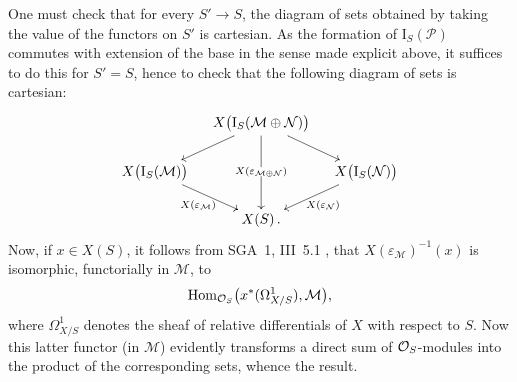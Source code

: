 One must check that for every \(S'\to S\), the diagram of sets obtained by
taking the value of the functors on \(S'\) is cartesian. As the formation of
\(\mathrm{I}_S(\mathcal{P})\) commutes with extension of the base in the sense
made explicit above, it suffices to do this for \(S'=S\), hence to check that
the following diagram of sets is cartesian:
\[
\xymatrix@C=1.2em@R=1.7em{
& X\bigl(\mathrm{I}_S(\mathcal{M}\oplus\mathcal{N})\bigr)
  \ar[dl] \ar[dd]|{X(\varepsilon_{\mathcal{M}\oplus\mathcal{N}})} \ar[dr] & \\
X\bigl(\mathrm{I}_S(\mathcal{M})\bigr) \ar[dr]_{X(\varepsilon_{\mathcal{M}})}
  & &
X\bigl(\mathrm{I}_S(\mathcal{N})\bigr) \ar[dl]^{X(\varepsilon_{\mathcal{N}})} \\
& X(S)\,. &
}
\]
Now, if \(x\in X(S)\), it follows from SGA~1, III~5.1%
{\renewcommand{\thefootnote}{(11)}},
that \(X(\varepsilon_{\mathcal{M}})^{-1}(x)\) is isomorphic, functorially in
\(\mathcal{M}\), to
\[
\operatorname{Hom}_{\mathcal{O}_S}\bigl(x^*(\Omega^1_{X/S}),\mathcal{M}\bigr),
\]
where \(\Omega^1_{X/S}\) denotes the sheaf of relative differentials of \(X\)
with respect to \(S\). Now this latter functor (in \(\mathcal{M}\)) evidently
transforms a direct sum of \(\mathcal{O}_S\)-modules into the product of the
corresponding sets, whence the result.
